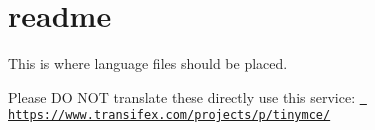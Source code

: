 \chapter{readme}
\hypertarget{md_public_2backend_2template__editor_2dist_2iframe_2tinymce_2langs_2readme}{}\label{md_public_2backend_2template__editor_2dist_2iframe_2tinymce_2langs_2readme}
This is where language files should be placed.

Please DO NOT translate these directly use this service\+: \href{https://www.transifex.com/projects/p/tinymce/}{\texttt{ https\+://www.\+transifex.\+com/projects/p/tinymce/}} 